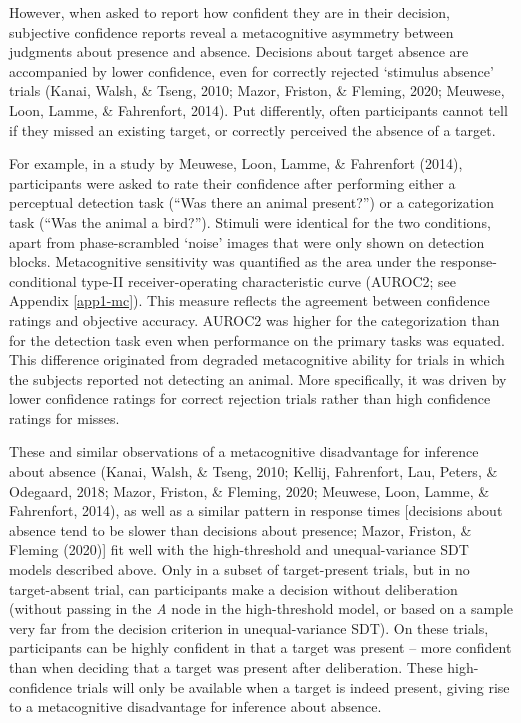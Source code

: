 \documentclass[12pt,twoside]{reedthesis}
\begin{document}
However, when asked to report how confident they are in their decision, subjective confidence reports reveal a metacognitive asymmetry between judgments about presence and absence. Decisions about target absence are accompanied by lower confidence, even for correctly rejected `stimulus absence' trials (Kanai, Walsh, \& Tseng, 2010; Mazor, Friston, \& Fleming, 2020; Meuwese, Loon, Lamme, \& Fahrenfort, 2014). Put differently, often participants cannot tell if they missed an existing target, or correctly perceived the absence of a target.

For example, in a study by Meuwese, Loon, Lamme, \& Fahrenfort (2014), participants were asked to rate their confidence after performing either a perceptual detection task (``Was there an animal present?'') or a categorization task (``Was the animal a bird?''). Stimuli were identical for the two conditions, apart from phase-scrambled `noise' images that were only shown on detection blocks. Metacognitive sensitivity was quantified as the area under the response-conditional type-II receiver-operating characteristic curve (AUROC2; see Appendix \ref{app1-mc}). This measure reflects the agreement between confidence ratings and objective accuracy. AUROC2 was higher for the categorization than for the detection task even when performance on the primary tasks was equated. This difference originated from degraded metacognitive ability for trials in which the subjects reported not detecting an animal. More specifically, it was driven by lower confidence ratings for correct rejection trials rather than high confidence ratings for misses.

These and similar observations of a metacognitive disadvantage for inference about absence (Kanai, Walsh, \& Tseng, 2010; Kellij, Fahrenfort, Lau, Peters, \& Odegaard, 2018; Mazor, Friston, \& Fleming, 2020; Meuwese, Loon, Lamme, \& Fahrenfort, 2014), as well as a similar pattern in response times {[}decisions about absence tend to be slower than decisions about presence; Mazor, Friston, \& Fleming (2020){]} fit well with the high-threshold and unequal-variance SDT models described above. Only in a subset of target-present trials, but in no target-absent trial, can participants make a decision without deliberation (without passing in the \emph{A} node in the high-threshold model, or based on a sample very far from the decision criterion in unequal-variance SDT). On these trials, participants can be highly confident in that a target was present -- more confident than when deciding that a target was present after deliberation. These high-confidence trials will only be available when a target is indeed present, giving rise to a metacognitive disadvantage for inference about absence.
\end{document}
